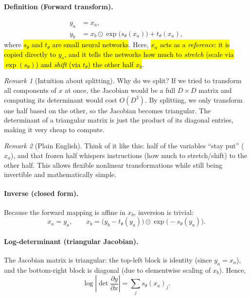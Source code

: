 \documentclass[11pt]{article}
\theoremstyle{remark}
\newtheorem*{remark}{Remark}
\newcommand{\pdv}[2]{\frac{\partial #1}{\partial #2}}
\begin{document}
\paragraph{Definition (Forward transform).}
\begin{align}
y_a &= x_a, \label{eq:coupling-ya}\\
y_b &= x_b \odot \exp\!\big( s_\theta(x_a) \big) + t_\theta(x_a),
\label{eq:coupling-yb}
\end{align}
where \hl{$s_\theta$ and $t_\theta$ are small neural networks}.
Here, \hl{$x_a$ acts as a \emph{reference}: it is copied directly to $y_a$,
and it tells the networks how much to \emph{stretch} (scale via $\exp(s_\theta)$)
and \emph{shift} (via $t_\theta$) the other half $x_b$}.

\begin{remark}[Intuition about splitting]
Why do we split? If we tried to transform all components of $x$ at once,
the Jacobian would be a full $D\times D$ matrix and computing its determinant
would cost $O(D^3)$. By splitting, we only transform one half based on the other,
so the Jacobian becomes triangular. The determinant of a triangular matrix is
just the product of its diagonal entries, making it very cheap to compute.
\end{remark}

\begin{remark}[Plain English]
Think of it like this: half of the variables ``stay put'' ($x_a$),
and that frozen half whispers instructions (how much to stretch/shift)
to the other half. This allows flexible nonlinear transformations
while still being invertible and mathematically simple.
\end{remark}

\paragraph{Inverse (closed form).}
Because the forward mapping is affine in $x_b$, inversion is trivial:
\begin{equation}
x_a = y_a, \qquad
x_b = \big(y_b - t_\theta(y_a)\big) \odot \exp\!\big( -s_\theta(y_a) \big).
\label{eq:coupling-inverse}
\end{equation}

\paragraph{Log-determinant (triangular Jacobian).}
The Jacobian matrix is triangular: the top-left block is identity (since $y_a=x_a$),
and the bottom-right block is diagonal (due to elementwise scaling of $x_b$).
Hence,
\begin{equation}
\log\left|\det \pdv{y}{x} \right| = \sum_j s_\theta(x_a)_j.
\label{eq:coupling-logdet}
\end{equation}
\end{document}

